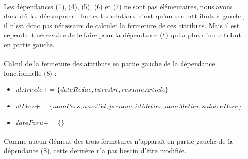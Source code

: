 \paragraph{}{
    Les dépendances (1), (4), (5), (6) et (7) ne sont pas élémentaires, nous avons donc dû les décomposer. Toutes les relations n'ont qu'un seul attributs à gauche, il n'est donc pas nécessaire de calculer la fermeture de ces attributs. Mais il est cependant nécessaire de le faire pour la dépendance (8) qui a plus d'un attribut en partie gauche.
    }

\paragraph{}{
    Calcul de la fermeture des attributs en partie gauche de la dépendance fonctionnelle (8) :
}
\begin{itemize}
    \item $idArticle+ = \{dateRedac, titreArt, resumeArticle\}$
    \item $idPers+ = \{nomPers, numTel, prenom, idMetier, nomMetier, salaireBase\}$
    \item $dateParu+ = \{\}$
\end{itemize}

\paragraph{}{Comme aucun élément des trois fermetures n'apparaît en partie gauche de la dépendance (8), cette dernière n'a pas besoin d'être modifiée.}
